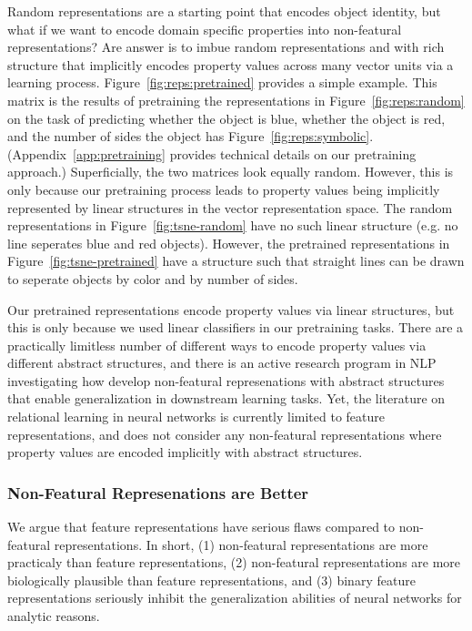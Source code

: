 \documentclass{article}
\newcommand{\Figref}[1]{Figure~\ref{#1}}
\newcommand{\figref}[1]{Figure~\ref{#1}}
\newcommand{\Appref}[1]{Appendix~\ref{#1}}
\begin{document}
{Random representations are a starting point that encodes object identity, but what if we want to encode domain specific properties into non-featural representations? Are answer is to imbue random representations and with rich structure that implicitly encodes property values across many vector units via a learning process. \Figref{fig:reps:pretrained} provides a simple example. This matrix is the results of pretraining the representations in \figref{fig:reps:random} on the task of predicting whether the object is blue, whether the object is red, and the number of sides the object has \figref{fig:reps:symbolic}. (\Appref{app:pretraining} provides technical details on our pretraining approach.) Superficially, the two matrices look equally random. However, this is only because our pretraining process leads to property values being implicitly represented by linear structures in the vector representation space.  The random representations in \figref{fig:tsne-random} have no such linear structure (e.g. no line seperates blue and red objects).   However, the pretrained representations in \figref{fig:tsne-pretrained} have a  structure such that straight lines can be drawn to seperate objects by color and by number of sides.

Our pretrained representations encode property values via linear structures, but this is only because we used linear classifiers in our pretraining tasks. There are a practically limitless number of different ways to encode property values via different abstract structures, and there is an active research program in NLP investigating how develop non-featural represenations with abstract structures that enable generalization in downstream learning tasks. Yet, the literature on relational learning in neural networks is currently limited to feature representations, and does not consider any non-featural representations where property values are encoded implicitly with abstract structures.



\subsubsection{Non-Featural Represenations are Better}

We argue that feature representations have serious flaws compared to non-featural representations. In short,  (1) non-featural representations are more practicaly than feature representations, (2) non-featural representations are more biologically plausible than feature representations, and (3) binary feature representations seriously inhibit the generalization abilities of neural networks for analytic reasons.

}
\end{document}
